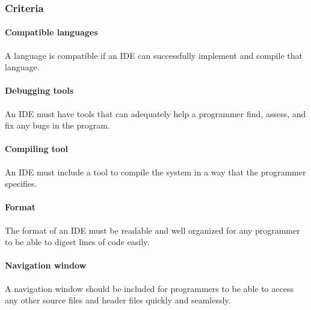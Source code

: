 \documentclass[10pt,letterpaper,onecolumn,draftclsnofoot]{IEEEtran}
\begin{document}
\subsubsection{Criteria}
\paragraph{Compatible languages}
A language is compatible if an IDE can successfully implement and compile that language.

\paragraph{Debugging tools}
An IDE must have tools that can adequately help a programmer find, assess, and fix any bugs in the program.

\paragraph{Compiling tool}
An IDE must include a tool to compile the system in a way that the programmer specifies.

\paragraph{Format}
The format of an IDE must be readable and well organized for any programmer to be able to digest lines of code easily.

\paragraph{Navigation window}
A navigation window should be included for programmers to be able to access any other source files and header files quickly and seamlessly.
\end{document}
